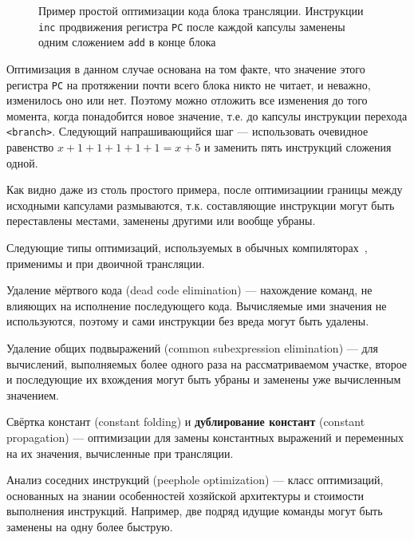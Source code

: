 \begin{figure}[htp]
    \centering
    \caption[Оптимизация при ДТ]{Пример простой оптимизации кода блока трансляции. Инструкции \texttt{inc} продвижения регистра \texttt{PC} после каждой капсулы заменены одним сложением \texttt{add} в конце блока}
    \label{fig:bt-optimization}
\end{figure}

Оптимизация в данном случае основана на том факте, что значение этого регистра \texttt{PC} на протяжении почти всего блока никто не читает, и неважно, изменилось оно или нет. Поэтому можно отложить все изменения до того  момента, когда понадобится новое значение, т.е. до капсулы  инструкции перехода \texttt{<branch>}. Следующий напрашивающийся шаг --- использовать очевидное равенство $x+1+1+1+1+1 = x +5$ и заменить пять инструкций сложения одной.

Как видно даже из столь простого примера, после оптимизациии границы между исходными капсулами размываются, т.к. составляющие инструкции могут быть переставлены местами, заменены другими или вообще убраны. 

Следующие типы оптимизаций, используемых в обычных компиляторах~\cite{dragonbook}, применимы и при двоичной трансляции.

\begin{description*}
\item[Удаление мёртвого кода] (\abbr dead code elimination) --- нахождение команд, не влияющих на исполнение последующего кода. Вычисляемые ими значения не используются, поэтому и сами инструкции без вреда могут быть удалены.
\item[Удаление общих подвыражений] (\abbr common subexpression elimination) ---  для вычислений, выполняемых более одного раза на рассматриваемом участке, второе и последующие их вхождения могут быть убраны и заменены уже вычисленным значением.
\item[Свёртка констант] (\abbr constant folding) и \textbf{дублирование констант} (\abbr constant propagation) --- оптимизации для замены константных выражений и переменных на их значения, вычисленные при трансляции.
\item[Анализ соседних инструкций] (\abbr peephole optimization) --- класс оптимизаций, основанных на знании особенностей хозяйской архитектуры и стоимости выполнения инструкций. Например, две подряд идущие команды могут быть заменены на одну более быструю.
\end{description*}

